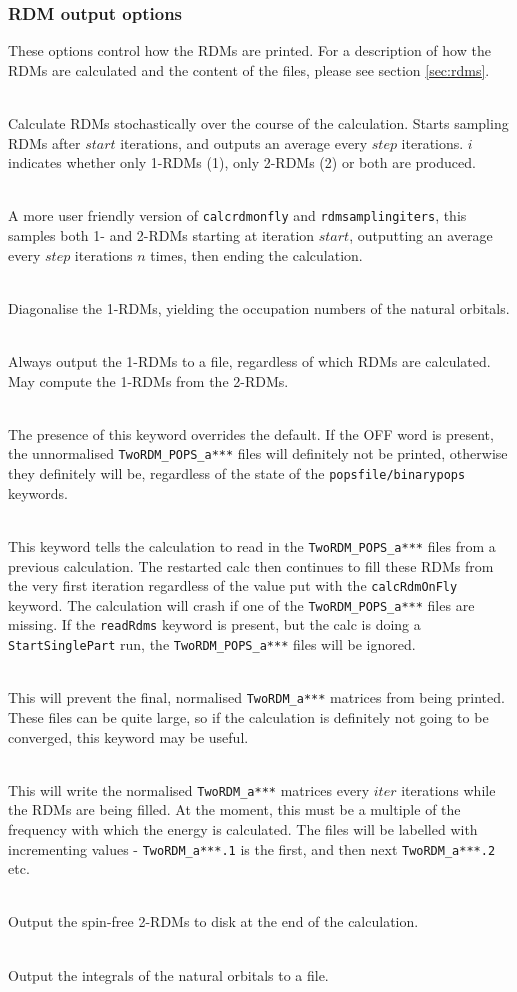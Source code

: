 \documentclass[a4paper,notitlepage,dvipsnames]{scrreprt}
\newcommand\codeitem[1]{\needspace{1.5\baselineskip}\item[\textnormal{\ttfamily #1 \nopagebreak}] \hfill \\ \nopagebreak}
\let\code\lstinline
\begin{document}
    \subsubsection{RDM output options}
    These options control how the RDMs are printed. For a description of how
    the RDMs are calculated and the content of the files, please see section \ref{sec:rdms}.
    \begin{description}
      \codeitem{calcRdmOnfly $i$ $step$ $start$}
      Calculate RDMs stochastically over the course of the calculation. Starts
      sampling RDMs after $start$ iterations, and outputs an average every $step$
      iterations. $i$ indicates whether only 1-RDMs (1), only 2-RDMs (2) or
      both are produced.
      \codeitem{rdmLinSpace $start$ $n$ $step$}
      A more user friendly version of \texttt{calcrdmonfly} and \texttt{rdmsamplingiters}, this samples both
      1- and 2-RDMs starting at iteration $start$, outputting an average every
      $step$ iterations $n$ times, then ending the calculation.
      \codeitem{diagFlyOneRdm}
      Diagonalise the 1-RDMs, yielding the occupation numbers of the natural
      orbitals.
      \codeitem{printOneRdm}
      Always output the 1-RDMs to a file, regardless of which RDMs are
      calculated. May compute the 1-RDMs from the 2-RDMs.
      \codeitem{writeRdmsToRead off}
      The presence of this keyword overrides the default.  If the OFF word is present, the unnormalised \code{TwoRDM_POPS_a***}
    files will definitely not be printed, otherwise they definitely will be, regardless of the state of the
    \code{popsfile/binarypops} keywords.

    \codeitem{readRdms}
    This keyword tells the calculation to read in the \code{TwoRDM_POPS_a***} files from a previous calculation.  The
    restarted calc then continues to fill these RDMs from the very first iteration regardless of the value put with
    the \code{calcRdmOnFly} keyword.  The calculation will crash if one of the \code{TwoRDM_POPS_a***} files are missing.  If
    the \code{readRdms} keyword is present, but the calc is doing a \code{StartSinglePart} run, the \code{TwoRDM_POPS_a***} files
    will be ignored.

    \codeitem{noNormRdms}
    This will prevent the final, normalised \code{TwoRDM_a***} matrices from being printed.  These files can be quite
    large, so if the calculation is definitely not going to be converged, this keyword may be useful.

    \codeitem{writeRdmsEvery $iter$}
    This will write the normalised \code{TwoRDM_a***} matrices every $iter$ iterations while the RDMs are being
    filled.  At the moment, this must be a multiple of the frequency with which the energy is calculated.  The
    files will be labelled with incrementing values - \code{TwoRDM_a***.1} is
    the first, and then next \code{TwoRDM_a***.2} etc.
    \codeitem{write-spin-free-rdm}
    Output the spin-free 2-RDMs to disk at the end of the calculation.
      \codeitem{printRoDump}
      Output the integrals of the natural orbitals to a file.
    \end{description}
\end{document}
